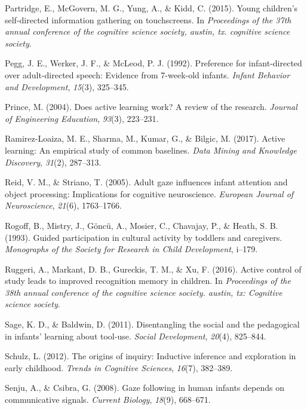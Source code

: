 \documentclass[a4paper,man,apacite,floatsintext]{apa6}
\begin{document}
\hypertarget{ref-partridge2015young}{}
Partridge, E., McGovern, M. G., Yung, A., \& Kidd, C. (2015). Young
children's self-directed information gathering on touchscreens. In
\emph{Proceedings of the 37th annual conference of the cognitive science
society, austin, tx. cognitive science society}.

\hypertarget{ref-pegg1992preference}{}
Pegg, J. E., Werker, J. F., \& McLeod, P. J. (1992). Preference for
infant-directed over adult-directed speech: Evidence from 7-week-old
infants. \emph{Infant Behavior and Development}, \emph{15}(3), 325--345.

\hypertarget{ref-prince2004does}{}
Prince, M. (2004). Does active learning work? A review of the research.
\emph{Journal of Engineering Education}, \emph{93}(3), 223--231.

\hypertarget{ref-ramirez2017active}{}
Ramirez-Loaiza, M. E., Sharma, M., Kumar, G., \& Bilgic, M. (2017).
Active learning: An empirical study of common baselines. \emph{Data
Mining and Knowledge Discovery}, \emph{31}(2), 287--313.

\hypertarget{ref-reid2005adult}{}
Reid, V. M., \& Striano, T. (2005). Adult gaze influences infant
attention and object processing: Implications for cognitive
neuroscience. \emph{European Journal of Neuroscience}, \emph{21}(6),
1763--1766.

\hypertarget{ref-rogoff1993guided}{}
Rogoff, B., Mistry, J., Göncü, A., Mosier, C., Chavajay, P., \& Heath,
S. B. (1993). Guided participation in cultural activity by toddlers and
caregivers. \emph{Monographs of the Society for Research in Child
Development}, i--179.

\hypertarget{ref-ruggeri2016active}{}
Ruggeri, A., Markant, D. B., Gureckis, T. M., \& Xu, F. (2016). Active
control of study leads to improved recognition memory in children. In
\emph{Proceedings of the 38th annual conference of the cognitive science
society. austin, tx: Cognitive science society}.

\hypertarget{ref-sage2011disentangling}{}
Sage, K. D., \& Baldwin, D. (2011). Disentangling the social and the
pedagogical in infants' learning about tool-use. \emph{Social
Development}, \emph{20}(4), 825--844.

\hypertarget{ref-schulz2012origins}{}
Schulz, L. (2012). The origins of inquiry: Inductive inference and
exploration in early childhood. \emph{Trends in Cognitive Sciences},
\emph{16}(7), 382--389.

\hypertarget{ref-senju2008gaze}{}
Senju, A., \& Csibra, G. (2008). Gaze following in human infants depends
on communicative signals. \emph{Current Biology}, \emph{18}(9),
668--671.
\end{document}

